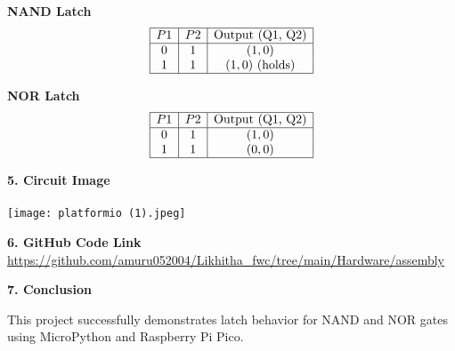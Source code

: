 \documentclass[12pt]{article}
\begin{document}
\vspace{2em}
\begin{minipage}{0.45\linewidth}
\centering
\textbf{NAND Latch} \\
\[
\begin{array}{|c|c|c|}
\hline
P1 & P2 & \text{Output (Q1, Q2)} \\
\hline
0 & 1 & (1, 0) \\
1 & 1 & (1, 0) \text{ (holds)} \\
\hline
\end{array}
\]
\end{minipage}
\hfill
\begin{minipage}{0.45\linewidth}
\centering
\textbf{NOR Latch} \\
\[
\begin{array}{|c|c|c|}
\hline
P1 & P2 & \text{Output (Q1, Q2)} \\
\hline
0 & 1 & (1, 0) \\
1 & 1 & (0, 0) \\
\hline
\end{array}
\]
\end{minipage}

\vspace{14em}
\noindent\textbf{5. Circuit Image} \\
\\
\texttt{[image: platformio (1).jpeg]}


\vspace{1em}
\noindent\textbf{6. GitHub Code Link} \\
\url{https://github.com/amuru052004/Likhitha_fwc/tree/main/Hardware/assembly}

\vspace{1em}
\noindent\textbf{7. Conclusion}

This project successfully demonstrates latch behavior for NAND and NOR gates using MicroPython and Raspberry Pi Pico. 
\end{document}

